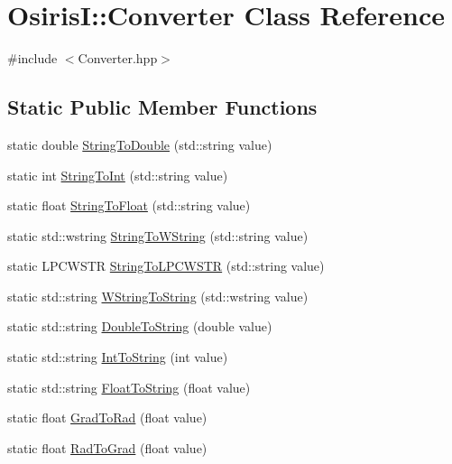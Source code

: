 \hypertarget{class_osiris_i_1_1_converter}{\section{Osiris\-I\-:\-:Converter Class Reference}
\label{class_osiris_i_1_1_converter}
}


{\ttfamily \#include $<$Converter.\-hpp$>$}

\subsection*{Static Public Member Functions}
\begin{DoxyCompactItemize}
\item 
static double \hyperlink{class_osiris_i_1_1_converter_ae647bd864c7b286da54e821b9f910d9e}{String\-To\-Double} (std\-::string value)
\item 
static int \hyperlink{class_osiris_i_1_1_converter_ac971dabd2c7c6478f5fc6ed8ca45517e}{String\-To\-Int} (std\-::string value)
\item 
static float \hyperlink{class_osiris_i_1_1_converter_a814d25bd8456e5a968d64f16c6d18615}{String\-To\-Float} (std\-::string value)
\item 
static std\-::wstring \hyperlink{class_osiris_i_1_1_converter_a3845170359e3fd4fbee18410a7ab15d5}{String\-To\-W\-String} (std\-::string value)
\item 
static L\-P\-C\-W\-S\-T\-R \hyperlink{class_osiris_i_1_1_converter_a25c14a9114a676c265c0c100aeac7cef}{String\-To\-L\-P\-C\-W\-S\-T\-R} (std\-::string value)
\item 
static std\-::string \hyperlink{class_osiris_i_1_1_converter_a3a6013e15b0158755bca2ecb9215cb0b}{W\-String\-To\-String} (std\-::wstring value)
\item 
static std\-::string \hyperlink{class_osiris_i_1_1_converter_aeaa6bfc13114b26a81e9c0e0a542b072}{Double\-To\-String} (double value)
\item 
static std\-::string \hyperlink{class_osiris_i_1_1_converter_a6b681773e472a16f1daba5bec930fb1a}{Int\-To\-String} (int value)
\item 
static std\-::string \hyperlink{class_osiris_i_1_1_converter_a2220efa1c6c01061ff7e4b504e47359d}{Float\-To\-String} (float value)
\item 
static float \hyperlink{class_osiris_i_1_1_converter_a09d200c4d454de86b414533d2526ae54}{Grad\-To\-Rad} (float value)
\item 
static float \hyperlink{class_osiris_i_1_1_converter_a1a3c68bb65ade757407ce8eb0e6399e3}{Rad\-To\-Grad} (float value)
\end{DoxyCompactItemize}


